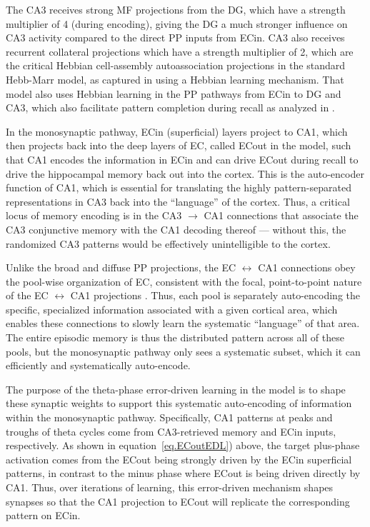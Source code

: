 \documentclass[11pt,twoside]{article}
\newif\myifpdf
\begin{document}
The CA3 receives strong MF projections from the DG, which have a strength multiplier of 4 (during encoding), giving the DG a much stronger influence on CA3 activity compared to the direct PP inputs from ECin.  CA3 also receives recurrent collateral projections which have a strength multiplier of 2, which are the critical Hebbian cell-assembly autoassociation projections in the standard Hebb-Marr model, as captured in \cite{KetzMorkondaOReilly13} using a Hebbian learning mechanism.  That model also uses Hebbian learning in the PP pathways from ECin to DG and CA3, which also facilitate pattern completion during recall as analyzed in \citet{OReillyMcClelland94}.

In the monosynaptic pathway, ECin (superficial) layers project to CA1, which then projects back into the deep layers of EC, called ECout in the model, such that CA1 encodes the information in ECin and can drive ECout during recall to drive the hippocampal memory back out into the cortex.  This is the auto-encoder function of CA1, which is essential for translating the highly pattern-separated representations in CA3 back into the ``language'' of the cortex.  Thus, a critical locus of memory encoding is in the CA3 $\rightarrow$ CA1 connections that associate the CA3 conjunctive memory with the CA1 decoding thereof --- without this, the randomized CA3 patterns would be effectively unintelligible to the cortex.

Unlike the broad and diffuse PP projections, the EC $\leftrightarrow$ CA1 connections obey the pool-wise organization of EC, consistent with the focal, point-to-point nature of the EC $\leftrightarrow$ CA1 projections \citep{WitterDoanJacobsenEtAl17}.  Thus, each pool is separately auto-encoding the specific, specialized information associated with a given cortical area, which enables these connections to slowly learn the systematic ``language'' of that area.  The entire episodic memory is thus the distributed pattern across all of these pools, but the monosynaptic pathway only sees a systematic subset, which it can efficiently and systematically auto-encode.

The purpose of the theta-phase error-driven learning in the \citet{KetzMorkondaOReilly13} model is to shape these synaptic weights to support this systematic auto-encoding of information within the monosynaptic pathway.  Specifically, CA1 patterns at peaks and troughs of theta cycles come from CA3-retrieved memory and ECin inputs, respectively.  As shown in equation~\ref{eq.ECoutEDL}) above, the target plus-phase activation comes from the ECout being strongly driven by the ECin superficial patterns, in contrast to the minus phase where ECout is being driven directly by CA1.  Thus, over iterations of learning, this error-driven mechanism shapes synapses so that the CA1 projection to ECout will replicate the corresponding pattern on ECin.
\end{document}
